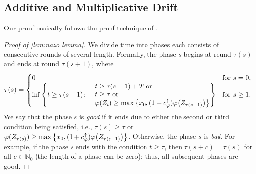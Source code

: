 \documentclass[letterpaper,11pt]{article}
\newcommand{\Nat}{\mathbb{N}}
\newcommand{\cphiup}{c_\varphi^{\uparrow}}
\begin{document}
\subsection{Additive and Multiplicative Drift} \label{sec:proof of nazo lemma}
Our proof basically follows the proof technique of \cite{Doerr11}.
\begin{proof}[Proof of \cref{lem:nazo lemma}]
    We divide time into phases each consists of consecutive rounds of several length.
    Formally, the phase $ s $ begins at round $ \tau(s) $ and ends at round $ \tau(s+1) $, where
    \begin{align*} 
        \tau(s)  = 
            \begin{cases}
                0	& \text{for $s=0$},\\
                \inf\qty{ t \ge \tau(s-1) \colon 
                \begin{aligned}
                &&&t\ge \tau(s-1)+ T  \text{ or} \\
                &&&t\ge \tau  \text{ or}\\
                &&&\varphi(Z_t) \ge \max\qty{  x_0, (1+\cphiup)\varphi\qty(Z_{\tau(s-1)}) }
                \end{aligned}
                } & \text{for $s\ge 1$}.
            \end{cases}
    \end{align*}
    We say that the phase $ s $ is \emph{good} if it ends
    due to either the second or third condition being satisfied, i.e.,
    $ \tau(s) \ge \tau $ or $ \varphi(Z_{\tau(s)}) \ge \max\qty{  x_0, (1+\cphiup)\varphi\qty(Z_{\tau(s-1)})}$.
    Otherwise, the phase $ s $ is \emph{bad}.
    For example, if the phase $ s $ ends with the condition $ t\ge\tau $, then $ \tau(s+c) = \tau(s)$ for all $ c\in\Nat_0 $ (the length of a phase can be zero); thus, all subsequent phases are good.



\end{proof}
\end{document}
